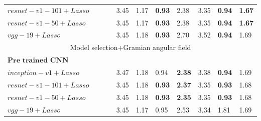 \documentclass[10pt,aspectratio=43]{beamer}
\begin{document}
\begin{frame}
\begin{table}
{\begin{tabular}{llllllll}
      $resnet-v1-101+Lasso$       & 3.45   & 1.17      & \textbf{0.93  }  & 2.38   & 3.35  & \textbf{0.94}  & \textbf{1.67}   \\
       $resnet-v1-50+Lasso$       & 3.45   & 1.17      & \textbf{0.93  }  & 2.38   & 3.35  & \textbf{0.94}  & \textbf{1.67}   \\
        $vgg-19+Lasso$       & 3.45   & 1.18      & \textbf{0.93  }  & 2.70   & 3.52  & \textbf{0.94}  & 1.69   \\
              \midrule
      \multicolumn{8}{c}{Model selection+Gramian angular field}\\
      $\textbf{Pre trained CNN model+Classifier}$\\
       $inception-v1+Lasso$      & 3.47   & 1.18     & 0.94   & \textbf{2.38}   & 3.38  & \textbf{0.94}  & 1.69   \\
      $resnet-v1-101+Lasso$       & 3.45   & 1.18      & \textbf{0.93  }  & \textbf{2.37}   & 3.35  & \textbf{0.93}  & 1.68   \\
       $resnet-v1-50+Lasso$       &3.45    &1.18      & \textbf{0.93  }   &\textbf{2.35}    & 3.35  &\textbf{0.93}   &1.68   \\
        $vgg-19+Lasso$       &3.45   &1.17       &0.95   &2.53  &3.34   &1.81   &1.69    \\
      \bottomrule
    \end{tabular}
  }
\end{table}
\end{frame}
\end{document}
